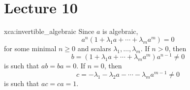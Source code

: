 \section*{Lecture 10}

\begin{sol}{xca:invertible_algebraic}
	Since $a$ is algebraic, 
	\[
		a^n(1+\lambda_1a+\cdots+\lambda_ma^m)=0
	\]
	for some minimal $n\geq0$ and scalars $\lambda_1,\dots,\lambda_m$. If  
	$n>0$, then 
	\[
	b=(1+\lambda_1a+\cdots+\lambda_ma^m)a^{n-1}\ne 0
	\]
	is such that $ab=ba=0$. If $n=0$, then  
	\[
		c=-\lambda_1-\lambda_2a-\cdots-\lambda_ma^{m-1}\ne 0
	\]
	is such that $ac=ca=1$. 
\end{sol}

